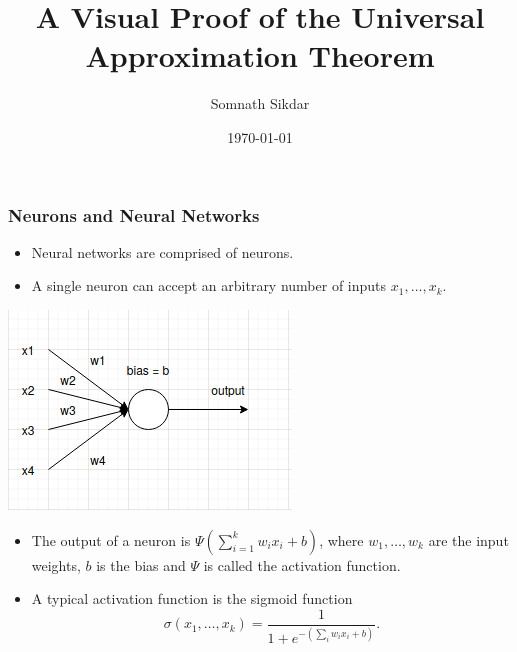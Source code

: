 \documentclass[11pt]{beamer}
\title[Universal Approximation]{A Visual Proof of the Universal Approximation
Theorem}
\author[Data Science]{Somnath Sikdar}
\date{\today}
\begin{document}
\maketitle

\begin{frame}[t]
\frametitle{Neurons and Neural Networks}
{\small
\begin{itemize}
    \item Neural networks are comprised of neurons.
    \item A single neuron can accept an arbitrary number of inputs
        $x_1, \ldots, x_k$.
\end{itemize}
}
\begin{minipage}[b]{0.25\textwidth}
\begin{center}
    \includegraphics[scale=0.35]{singleNeuron.png}
\end{center}
\end{minipage}
\hfill
\begin{minipage}[b]{0.7\textwidth}
{\small
\begin{itemize}
    \item The output of a neuron is $\Psi(\sum_{i = 1}^{k} w_i x_i + b)$,
        where $w_1, \ldots, w_k$ are the input weights, $b$ is the bias
        and $\Psi$ is called the activation function.
    \item A typical activation function is the sigmoid function
        \[\sigma(x_1, \ldots, x_k) = \frac{1}{1 + e^{- (\sum_{i} w_i x_i + b)}}.\]
\end{itemize}
}
\end{minipage}
\end{frame}
\end{document}
